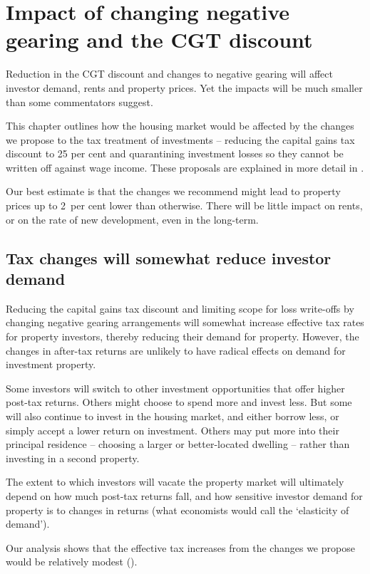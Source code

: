 \chapter{Impact of changing negative gearing and the CGT discount}\label{chapter:Impacts}
Reduction in the CGT discount and changes to negative gearing will affect investor demand, rents and property prices. Yet the impacts will be much smaller than some commentators suggest. 

This chapter outlines how the housing market would be affected by the changes we propose to the tax treatment of investments – reducing the capital gains tax discount to 25 per cent and quarantining investment losses so they cannot be written off against wage income. 
These proposals are explained in more detail in . 

Our best estimate is that the changes we recommend might lead to property prices up to 2~per cent lower than otherwise. There will be little impact on rents, or on the rate of new development, even in the long-term.


\section{Tax changes will somewhat reduce investor demand}
Reducing the capital gains tax discount and limiting scope for loss write-offs by changing negative gearing arrangements will somewhat increase effective tax rates for property investors, thereby reducing their demand for property. 
However, the changes in after-tax returns are unlikely to have radical effects on demand for investment property.

Some investors will switch to other investment opportunities that offer higher post-tax returns. Others might choose to spend more and invest less. But some will also continue to invest in the housing market, and either borrow less, or simply accept a lower return on investment. Others may put more into their principal residence – choosing a larger or better-located dwelling – rather than investing in a second property.

The extent to which investors will vacate the property market will ultimately depend on how much post-tax returns fall, and how sensitive investor demand for property is to changes in returns (what economists would call the ‘elasticity of demand’).

Our analysis shows that the effective tax increases from the changes we propose would be relatively modest (). 

